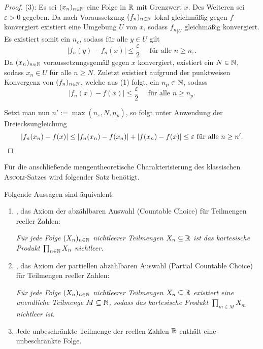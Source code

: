 \begin{proof}
  (3): 
  Es sei $(x_n)_{n \in \mathbb{N}}$ eine Folge in $\mathbb{R}$ mit Grenzwert $x$.
  Des Weiteren sei $\varepsilon > 0$ gegeben.
  Da nach Voraussetzung $(f_n)_{n \in \mathbb{N}}$ lokal gleichmäßig gegen $f$ konvergiert existiert eine Umgebung $U$ von $x$, sodass ${f_n}_{| U}$ gleichmäßig konvergiert.
  Es existiert somit ein $n_\varepsilon$, sodass für alle $y \in U$ gilt 
  \begin{displaymath}
    | f_n(y) - f_n(x) | \leq \frac{\varepsilon}{2} \quad \text{ für alle $n \geq n_\varepsilon$}.
  \end{displaymath}
  Da $(x_n)_{n \in \mathbb{N}}$ voraussetzungsgemäß gegen $x$ konvergiert, existiert ein $N \in \mathbb{N}$, sodass $x_n \in U$ für alle $n \geq N$.
  Zuletzt existiert aufgrund der punktweisen Konvergenz von $(f_n)_{n \in \mathbb{N}}$, welche aus (1) folgt, ein $n_p \in \mathbb{N}$, sodass
  \begin{displaymath}
    | f_n(x) - f(x) | \leq \frac{\varepsilon}{2} \quad \text{ für alle $n \geq n_p$}.
  \end{displaymath}

  Setzt man nun $n':= \max(n_\varepsilon, N, n_p)$, so folgt unter Anwendung der Dreiecksungleichung
  \begin{displaymath}
    | f_n(x_n) - f(x) |
    \leq
    | f_n(x_n) - f(x_n) | + | f(x_n) - f(x) | 
    \leq \varepsilon \text{ für alle $n \geq n'$}. \qedhere
  \end{displaymath}
\end{proof}

Für die anschließende mengentheoretische Charakterisierung des klassischen \textsc{Ascoli}\hyp{}Satzes wird folgender Satz benötigt.

\begin{thm}
  \label{thm:unboundedsubsetofR}
  Folgende Aussagen sind äquivalent:
  \begin{enumerate}[(1)]
    \item \CCR, das Axiom der abzählbaren Auswahl (Countable Choice) für Teilmengen reeller Zahlen:
      \begin{addmargin}[2em]{2em}%
        \textit{Für jede Folge $(X_n)_{n \in \mathbb{N}}$ nichtleerer Teilmengen $X_n \subseteq \mathbb{R}$ ist das kartesische Produkt $\prod_{n \in \mathbb{N}} X_n$ nichtleer.}
      \end{addmargin}
    \item \PCCR, das Axiom der partiellen abzählbaren Auswahl (Partial Countable Choice) für Teilmengen reeller Zahlen: 
      \begin{addmargin}[2em]{2em}%
        \textit{Für jede Folge $(X_n)_{n \in \mathbb{N}}$ nichtleerer Teilmengen $X_n \subseteq \mathbb{R}$ existiert eine unendliche Teilmenge $M \subseteq \mathbb{N}$, sodass das kartesische Produkt $\prod_{m \in M} X_m$ nichtleer ist.}
      \end{addmargin}
    \item Jede unbeschränkte Teilmenge der reellen Zahlen $\mathbb{R}$ enthält eine unbeschränkte Folge.
  \end{enumerate}
\end{thm}


